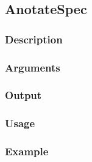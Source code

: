 \subsection{AnotateSpec}
\subsubsection{Description}
\subsubsection{Arguments}
\subsubsection{Output}
\subsubsection{Usage}
\subsubsection{Example}